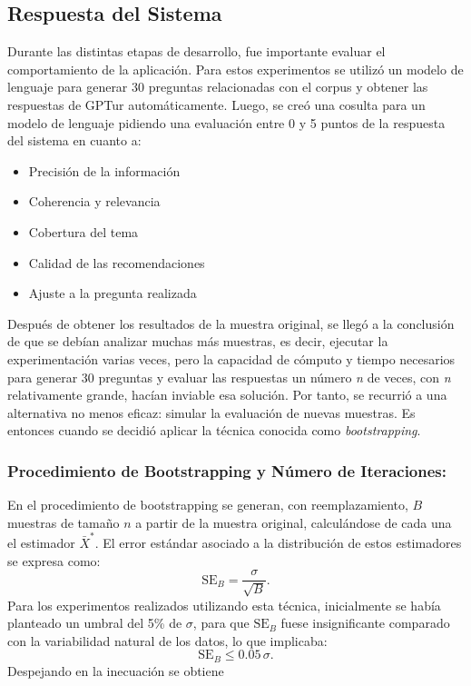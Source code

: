 \documentclass[10pt]{llncs}
\begin{document}
\subsection{Respuesta del Sistema}

Durante las distintas etapas de desarrollo, fue importante evaluar el comportamiento de la aplicación. Para estos experimentos se utilizó un modelo de lenguaje para generar 30 preguntas relacionadas con el corpus y obtener las respuestas de GPTur automáticamente. Luego, 
se creó una cosulta para un modelo de lenguaje pidiendo una evaluación entre 0 y 5 puntos de la respuesta del sistema en cuanto a:
\begin{itemize}
    \item  Precisión de la información
    \item Coherencia y relevancia
    \item Cobertura del tema
    \item Calidad de las recomendaciones
    \item Ajuste a la pregunta realizada
\end{itemize}

Después de obtener los resultados de la muestra original, se llegó a la conclusión de que se debían analizar muchas más muestras, es decir, ejecutar la experimentación varias veces, pero la capacidad de cómputo y tiempo necesarios para generar 30 preguntas y evaluar las respuestas un número \textit{n} de veces, con \textit{n} relativamente 
grande, hacían inviable esa solución. Por tanto, se recurrió a una alternativa no menos eficaz: simular la evaluación de nuevas muestras. Es entonces cuando se decidió aplicar la técnica conocida como \textit{bootstrapping}.

\subsubsection{Procedimiento de Bootstrapping y Número de Iteraciones:}

En el procedimiento de bootstrapping se generan, con reemplazamiento, $B$ muestras de tamaño $n$ a partir de la muestra original, calculándose de cada una el estimador $\bar{X}^*$.
El error estándar asociado a la distribución de estos estimadores se expresa como:
\begin{equation}
\text{SE}_B = \frac{\sigma}{\sqrt{B}}.
\end{equation}
Para los experimentos realizados utilizando esta técnica, inicialmente se había planteado un umbral del 5\% de $\sigma$, para que $\text{SE}_B$ fuese insignificante comparado con la variabilidad natural de los datos, lo que implicaba:
\begin{equation}
\text{SE}_B \leq 0.05\,\sigma.
\end{equation}
Despejando en la inecuación se obtiene
\end{document}
